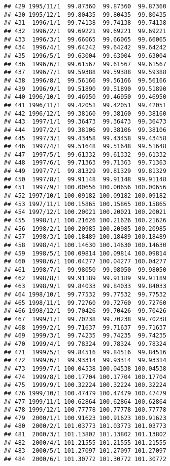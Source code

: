 \documentclass[
]{article}
\begin{document}
\begin{verbatim}
## 429 1995/11/1  99.87360  99.87360  99.87360
## 430 1995/12/1  99.80435  99.80435  99.80435
## 431  1996/1/1  99.74138  99.74138  99.74138
## 432  1996/2/1  99.69221  99.69221  99.69221
## 433  1996/3/1  99.66065  99.66065  99.66065
## 434  1996/4/1  99.64242  99.64242  99.64242
## 435  1996/5/1  99.63004  99.63004  99.63004
## 436  1996/6/1  99.61567  99.61567  99.61567
## 437  1996/7/1  99.59388  99.59388  99.59388
## 438  1996/8/1  99.56166  99.56166  99.56166
## 439  1996/9/1  99.51890  99.51890  99.51890
## 440 1996/10/1  99.46950  99.46950  99.46950
## 441 1996/11/1  99.42051  99.42051  99.42051
## 442 1996/12/1  99.38160  99.38160  99.38160
## 443  1997/1/1  99.36473  99.36473  99.36473
## 444  1997/2/1  99.38106  99.38106  99.38106
## 445  1997/3/1  99.43458  99.43458  99.43458
## 446  1997/4/1  99.51648  99.51648  99.51648
## 447  1997/5/1  99.61332  99.61332  99.61332
## 448  1997/6/1  99.71363  99.71363  99.71363
## 449  1997/7/1  99.81329  99.81329  99.81329
## 450  1997/8/1  99.91148  99.91148  99.91148
## 451  1997/9/1 100.00656 100.00656 100.00656
## 452 1997/10/1 100.09182 100.09182 100.09182
## 453 1997/11/1 100.15865 100.15865 100.15865
## 454 1997/12/1 100.20021 100.20021 100.20021
## 455  1998/1/1 100.21626 100.21626 100.21626
## 456  1998/2/1 100.20985 100.20985 100.20985
## 457  1998/3/1 100.18489 100.18489 100.18489
## 458  1998/4/1 100.14630 100.14630 100.14630
## 459  1998/5/1 100.09814 100.09814 100.09814
## 460  1998/6/1 100.04277 100.04277 100.04277
## 461  1998/7/1  99.98050  99.98050  99.98050
## 462  1998/8/1  99.91189  99.91189  99.91189
## 463  1998/9/1  99.84033  99.84033  99.84033
## 464 1998/10/1  99.77532  99.77532  99.77532
## 465 1998/11/1  99.72760  99.72760  99.72760
## 466 1998/12/1  99.70426  99.70426  99.70426
## 467  1999/1/1  99.70238  99.70238  99.70238
## 468  1999/2/1  99.71637  99.71637  99.71637
## 469  1999/3/1  99.74235  99.74235  99.74235
## 470  1999/4/1  99.78324  99.78324  99.78324
## 471  1999/5/1  99.84516  99.84516  99.84516
## 472  1999/6/1  99.93314  99.93314  99.93314
## 473  1999/7/1 100.04538 100.04538 100.04538
## 474  1999/8/1 100.17704 100.17704 100.17704
## 475  1999/9/1 100.32224 100.32224 100.32224
## 476 1999/10/1 100.47479 100.47479 100.47479
## 477 1999/11/1 100.62864 100.62864 100.62864
## 478 1999/12/1 100.77778 100.77778 100.77778
## 479  2000/1/1 100.91623 100.91623 100.91623
## 480  2000/2/1 101.03773 101.03773 101.03773
## 481  2000/3/1 101.13802 101.13802 101.13802
## 482  2000/4/1 101.21555 101.21555 101.21555
## 483  2000/5/1 101.27097 101.27097 101.27097
## 484  2000/6/1 101.30772 101.30772 101.30772

\end{verbatim}
\end{document}

